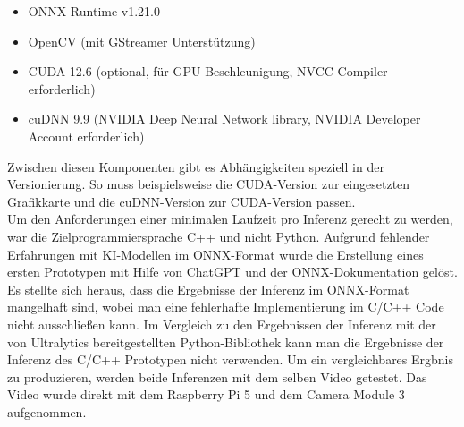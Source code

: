 \begin{itemize}
  \item ONNX Runtime v1.21.0
  \item OpenCV (mit GStreamer Unterstützung)
  \item CUDA 12.6 (optional, für GPU-Beschleunigung, NVCC Compiler erforderlich)
  \item cuDNN 9.9 (NVIDIA Deep Neural Network library, NVIDIA Developer Account erforderlich)
\end{itemize}

\newpage
Zwischen diesen Komponenten gibt es Abhängigkeiten speziell in der Versionierung. So muss beispielsweise die CUDA-Version zur eingesetzten Grafikkarte und die cuDNN-Version zur CUDA-Version passen. \\ Um den Anforderungen einer minimalen Laufzeit pro Inferenz gerecht zu werden, war die Zielprogrammiersprache C++ und nicht Python. Aufgrund fehlender Erfahrungen mit KI-Modellen im ONNX-Format wurde die Erstellung eines ersten Prototypen mit Hilfe von ChatGPT und der ONNX-Dokumentation gelöst. Es stellte sich heraus, dass die Ergebnisse der Inferenz im ONNX-Format mangelhaft sind, wobei man eine fehlerhafte Implementierung im C/C++ Code nicht ausschließen kann. Im Vergleich zu den Ergebnissen der Inferenz mit der von Ultralytics bereitgestellten Python-Bibliothek kann man die Ergebnisse der Inferenz des C/C++ Prototypen nicht verwenden. Um ein vergleichbares Ergbnis zu produzieren, werden beide Inferenzen mit dem selben Video getestet. Das Video wurde direkt mit dem Raspberry Pi 5 und dem Camera Module 3 aufgenommen.

